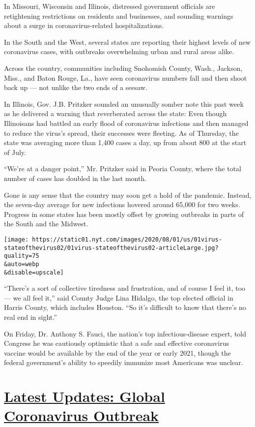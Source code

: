 In Missouri, Wisconsin and Illinois, distressed government officials are
retightening restrictions on residents and businesses, and sounding
warnings about a surge in coronavirus-related hospitalizations.

In the South and the West, several states are reporting their highest
levels of new coronavirus cases, with outbreaks overwhelming urban and
rural areas alike.

Across the country, communities including Snohomish County, Wash.,
Jackson, Miss., and Baton Rouge, La., have seen coronavirus numbers fall
and then shoot back up --- not unlike the two ends of a seesaw.

In Illinois, Gov. J.B. Pritzker sounded an unusually somber note this
past week as he delivered a warning that reverberated across the state:
Even though Illinoisans had battled an early flood of coronavirus
infections and then managed to reduce the virus's spread, their
successes were fleeting. As of Thursday, the state was averaging more
than 1,400 cases a day, up from about 800 at the start of July.

``We're at a danger point,'' Mr. Pritzker said in Peoria County, where
the total number of cases has doubled in the last month.

Gone is any sense that the country may soon get a hold of the pandemic.
Instead, the seven-day average for new infections hovered around 65,000
for two weeks. Progress in some states has been mostly offset by growing
outbreaks in parts of the South and the Midwest.

\texttt{[image: https://static01.nyt.com/images/2020/08/01/us/01virus-stateofthevirus02/01virus-stateofthevirus02-articleLarge.jpg?quality=75\\\&auto=webp\\\&disable=upscale]}

``There's a sort of collective tiredness and frustration, and of course
I feel it, too --- we all feel it,'' said County Judge Lina Hidalgo, the
top elected official in Harris County, which includes Houston. ``So it's
difficult to know that there's no real end in sight.''

On Friday, Dr. Anthony S. Fauci, the nation's top infectious-disease
expert, told Congress he was cautiously optimistic that a safe and
effective coronavirus vaccine would be available by the end of the year
or early 2021, though the federal government's ability to speedily
immunize most Americans was unclear.

\hypertarget{latest-updates-global-coronavirus-outbreak}{%
\section{\texorpdfstring{\href{https://www.nytimes.com/2020/08/01/world/coronavirus-covid-19.html?action=click\&pgtype=Article\&state=default\&region=MAIN_CONTENT_1\&context=storylines_live_updates}{Latest
Updates: Global Coronavirus
Outbreak}}{Latest Updates: Global Coronavirus Outbreak}}\label{latest-updates-global-coronavirus-outbreak}}

